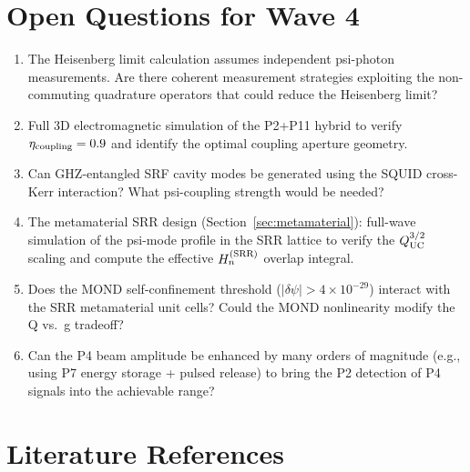 \documentclass[11pt,twocolumn]{article}
\newcommand{\dpsi}{\delta\psi}
\newcommand{\ee}[1]{\times 10^{#1}}
\theoremstyle{definition}
\theoremstyle{remark}
\begin{document}
\section{Open Questions for Wave 4}
\label{sec:open}

\begin{enumerate}
\item The Heisenberg limit calculation assumes independent psi-photon measurements.
      Are there coherent measurement strategies exploiting the non-commuting
      quadrature operators that could reduce the Heisenberg limit?
\item Full 3D electromagnetic simulation of the P2+P11 hybrid to verify
      $\eta_{\rm coupling} = 0.9$ and identify the optimal coupling aperture geometry.
\item Can GHZ-entangled SRF cavity modes be generated using the SQUID
      cross-Kerr interaction?  What psi-coupling strength would be needed?
\item The metamaterial SRR design (Section~\ref{sec:metamaterial}):
      full-wave simulation of the psi-mode profile in the SRR lattice
      to verify the $Q_{\rm UC}^{3/2}$ scaling and compute the effective
      $H_n^{(\rm SRR)}$ overlap integral.
\item Does the MOND self-confinement threshold ($|\dpsi| > 4\ee{-29}$)
      interact with the SRR metamaterial unit cells?  Could the MOND
      nonlinearity modify the Q vs.\ g tradeoff?
\item Can the P4 beam amplitude be enhanced by many orders of magnitude
      (e.g., using P7 energy storage + pulsed release) to bring the
      P2 detection of P4 signals into the achievable range?
\end{enumerate}

\section*{Literature References}
\end{document}
